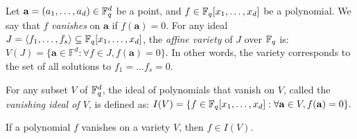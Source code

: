 Let $\mathbf{a} = (a_1, \dots, a_d) \in {\mathbb{F}}_{q}^d$ be a point, and
$f \in {\mathbb{F}}_{q}[x_1,\dots, x_d]$ be a polynomial. We say that $f$
{\it vanishes} on $\mathbf{a}$ if $f(\mathbf{a}) = 0$. 
For any ideal $J = \langle f_1, \dots, f_s \rangle \subseteq
{\mathbb{F}}_{q}[x_1,\dots, x_d]$, the {\it affine variety} of $J$ over
${\mathbb{F}}_{q}$ is:
$V(J) = \{\mathbf{a} \in \mathbb{F}^d: \forall f \in
J, f(\mathbf{a}) = 0\}.$ In other words, the variety corresponds to
the set of all solutions to $f_1 = \dots f_s = 0$. 



For any subset $V$ of ${\mathbb{F}}_{q}^d$, the ideal of polynomials that
vanish on $V$, called the {\it vanishing ideal of $V$}, is defined as: 
$I(V) = \{f\in {\mathbb{F}}_{q}[x_1,\dots, x_d]: \forall
\mathbf{a} \in V, f(\mathbf{a}) = 0\}.$

\begin{Proposition}
\label{prop:finIV}
If a polynomial $f$ vanishes on a variety $V$, then $f \in I(V)$. 
\end{Proposition}





